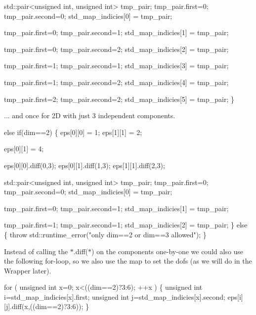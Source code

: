 \begin{DoxyCode}
    std::pair<unsigned int, unsigned int> tmp\_pair;
    tmp\_pair.first=0; tmp\_pair.second=0;
    std\_map\_indicies[0] = tmp\_pair;

    tmp\_pair.first=0; tmp\_pair.second=1;
    std\_map\_indicies[1] = tmp\_pair;

    tmp\_pair.first=0; tmp\_pair.second=2;
    std\_map\_indicies[2] = tmp\_pair;

    tmp\_pair.first=1; tmp\_pair.second=1;
    std\_map\_indicies[3] = tmp\_pair;

    tmp\_pair.first=1; tmp\_pair.second=2;
    std\_map\_indicies[4] = tmp\_pair;

    tmp\_pair.first=2; tmp\_pair.second=2;
    std\_map\_indicies[5] = tmp\_pair;
\}
\end{DoxyCode}
 ... and once for 2D with just 3 independent components. 
\begin{DoxyCode}
\textcolor{keywordflow}{else} \textcolor{keywordflow}{if}(dim==2)
\{
    eps[0][0] = 1;
    eps[1][1] = 2;

    eps[0][1] = 4;


    eps[0][0].diff(0,3);
    eps[0][1].diff(1,3);
    eps[1][1].diff(2,3);

    std::pair<unsigned int, unsigned int> tmp\_pair;
    tmp\_pair.first=0; tmp\_pair.second=0;
    std\_map\_indicies[0] = tmp\_pair;

    tmp\_pair.first=0; tmp\_pair.second=1;
    std\_map\_indicies[1] = tmp\_pair;

    tmp\_pair.first=1; tmp\_pair.second=1;
    std\_map\_indicies[2] = tmp\_pair;        
\}
\textcolor{keywordflow}{else}
\{
    \textcolor{keywordflow}{throw} std::runtime\_error(\textcolor{stringliteral}{"only dim==2 or dim==3 allowed"});
\}
\end{DoxyCode}
 Instead of calling the $\ast$.diff($\ast$) on the components one-\/by-\/one we could also use the following for-\/loop, so we also use the map to set the dofs (as we will do in the Wrapper later). 
\begin{DoxyCode}
\textcolor{keywordflow}{for} ( \textcolor{keywordtype}{unsigned} \textcolor{keywordtype}{int} x=0; x<((dim==2)?3:6); ++x )
\{
    \textcolor{keywordtype}{unsigned} \textcolor{keywordtype}{int} i=std\_map\_indicies[x].first;
    \textcolor{keywordtype}{unsigned} \textcolor{keywordtype}{int} j=std\_map\_indicies[x].second;
    eps[i][j].diff(x,((dim==2)?3:6));
\}
\end{DoxyCode}


